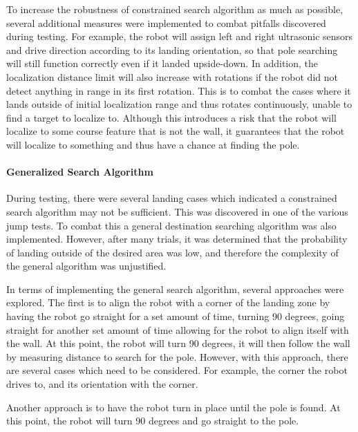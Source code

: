 \documentclass[ece]{uw-wkrpt}
\begin{document}
To increase the robustness of constrained search algorithm as much as possible, several additional measures were implemented to combat pitfalls discovered during testing. For example, the robot will assign left and right ultrasonic sensors and drive direction according to its landing orientation, so that pole searching will still function correctly even if it landed upside-down. In addition, the localization distance limit will also increase with rotations if the robot did not detect anything in range in its first rotation. This is to combat the cases where it lands outside of initial localization range and thus rotates continuously, unable to find a target to localize to. Although this introduces a risk that the robot will localize to some course feature that is not the wall, it guarantees that the robot will localize to something and thus have a chance at finding the pole. 

\paragraph{Generalized Search Algorithm}

During testing, there were several landing cases which indicated a constrained search algorithm may not be sufficient. This was discovered in one of the various jump tests. To combat this a general destination searching algorithm was also implemented. However, after many trials, it was determined that the probability of landing outside of the desired area was low, and therefore the complexity of the general algorithm was unjustified.

In terms of implementing the general search algorithm, several approaches were explored. The first is to align the robot with a corner of the landing zone by having the robot go straight for a set amount of time, turning 90 degrees, going straight for another set amount of time allowing for the robot to align itself with the wall. At this point, the robot will turn 90 degrees, it will then follow the wall by measuring distance to search for the pole. However, with this approach, there are several cases which need to be considered. For example, the corner the robot drives to, and its orientation with the corner. 

Another approach is to have the robot turn in place until the pole is found. At this point, the robot will turn 90 degrees and go straight to the pole. 
\end{document}
